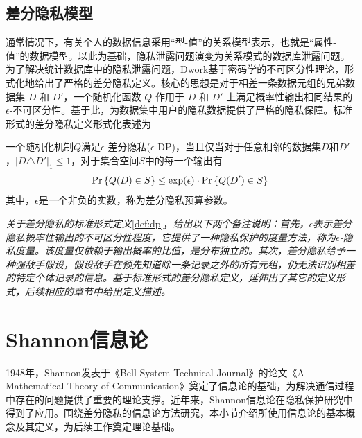 \subsection{差分隐私模型}
通常情况下，有关个人的数据信息采用``型-值''的关系模型表示，也就是``属性-值''的数据模型。以此为基础，隐私泄露问题演变为关系模式的数据库泄露问题。为了解决统计数据库中的隐私泄露问题，Dwork\cite{dwork2006calibrating,dwork2006differential,dwork2014algorithmic,dwork2015the}基于密码学的不可区分性理论，形式化地给出了严格的差分隐私定义。核心的思想是对于相差一条数据元组的兄弟数据集 $D$ 和 $D'$，一个随机化函数 $Q$ 作用于 $D$ 和 $D'$ 上满足概率性输出相同结果的$\epsilon$-不可区分性。基于此，为数据集中用户的隐私数据提供了严格的隐私保障。标准形式的差分隐私定义形式化表述为
\begin{definition}\label{def:dp}一个随机化机制$Q$满足$\epsilon$-差分隐私($\epsilon$-DP)，当且仅当对于任意相邻的数据集$D$和$D'$，$|D\triangle D'|_1\leq 1$，对于集合空间$S$中的每一个输出有
	\begin{equation}
		{\rm Pr}\left\{Q(D)\in S\right\} \leq  \exp(\epsilon)\cdot {\rm Pr}\left\{Q(D')\in S\right\}
	\end{equation}
其中，$\epsilon$是一个非负的实数，称为差分隐私预算参数。
\end{definition}

\begin{remark}{\em
关于差分隐私的标准形式定义}\ref{def:dp}，{\em 给出以下两个备注说明：首先，$\epsilon$表示差分隐私概率性输出的不可区分性程度，它提供了一种隐私保护的度量方法，称为$\epsilon$-隐私度量。该度量仅依赖于输出概率的比值，是分布独立的。其次，差分隐私给予一种强敌手假设，假设敌手在预先知道除一条记录之外的所有元组，仍无法识别相差的特定个体记录的信息。基于标准形式的差分隐私定义，延伸出了其它的定义形式，后续相应的章节中给出定义描述。}
\end{remark}
\section{Shannon信息论}
1948年，Shannon\cite{shannon1948a}发表于《Bell System Technical Journal》的论文《A Mathematical Theory of Communication》奠定了信息论的基础，为解决通信过程中存在的问题提供了重要的理论支撑。近年来，Shannon信息论在隐私保护研究中得到了应用。围绕差分隐私的信息论方法研究，本小节介绍所使用信息论的基本概念及其定义，为后续工作奠定理论基础。
